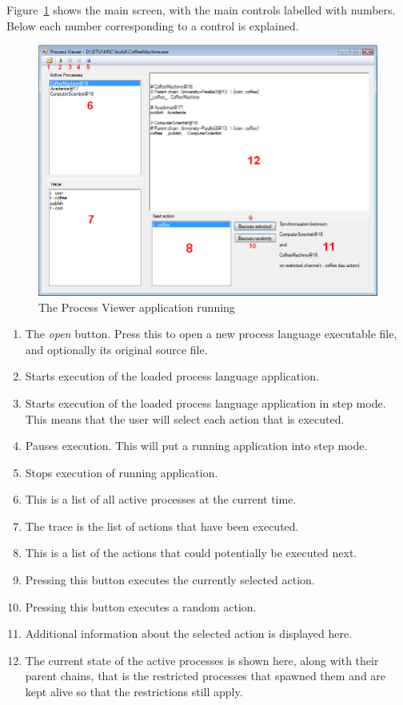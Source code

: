 	Figure~\ref{fig:process_viewer_tutorial} shows the main screen, with the 
	main controls labelled with numbers. Below each number corresponding to a 
	control is explained.

	\begin{figure}[h!]
		\centering
		\includegraphics[scale=0.4]{process_viewer_appendix.png}
		\caption{The Process Viewer application running}
		\label{fig:process_viewer_tutorial}
	\end{figure}
	
	\begin{enumerate}
		\item The \textit{open} button. Press this to open a new process language 
		executable file, and optionally its original source file.
		\item Starts execution of the loaded process language application.
		\item Starts execution of the loaded process language application in step 
		mode. This means that the user will select each action that is executed.
		\item Pauses execution. This will put a running application into step mode.
		\item Stops execution of running application.
		\item This is a list of all active processes at the current time.
		\item The trace is the list of actions that have been executed.
		\item This is a list of the actions that could potentially be executed 
		next.
		\item Pressing this button executes the currently selected action.
		\item Pressing this button executes a random action.
		\item Additional information about the selected action is displayed here.
		\item The current state of the active processes is shown here, along with
		their parent chains, that is the restricted processes that spawned them
		and are kept alive so that the restrictions still apply.
	\end{enumerate}